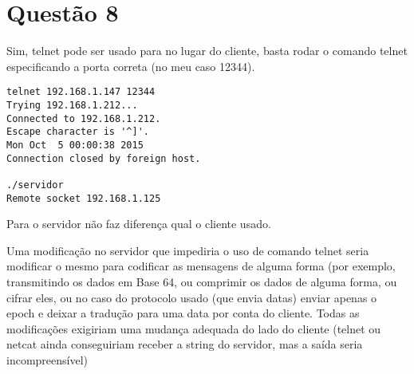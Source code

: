 \documentclass[11pt]{article}
\begin{document}
\section*{Questão 8}
\label{sec-8}

Sim, telnet pode ser usado para no lugar do cliente, basta rodar o
comando telnet especificando a porta correta (no meu caso 12344).

\begin{verbatim}
telnet 192.168.1.147 12344
Trying 192.168.1.212...
Connected to 192.168.1.212.
Escape character is '^]'.
Mon Oct  5 00:00:38 2015
Connection closed by foreign host.

./servidor
Remote socket 192.168.1.125
\end{verbatim}

Para o servidor não faz diferença qual o cliente usado.

Uma modificação no servidor que impediria o uso de comando telnet
seria modificar o mesmo para codificar as mensagens de alguma forma
(por exemplo, transmitindo os dados em Base 64, ou comprimir os dados
de alguma forma, ou cifrar eles, ou no caso do protocolo usado (que
envia datas) enviar apenas o epoch e deixar a tradução para uma data
por conta do cliente. Todas as modificações exigiriam uma mudança
adequada do lado do cliente (telnet ou netcat ainda conseguiriam
receber a string do servidor, mas a saída seria incompreensível)
\end{document}
